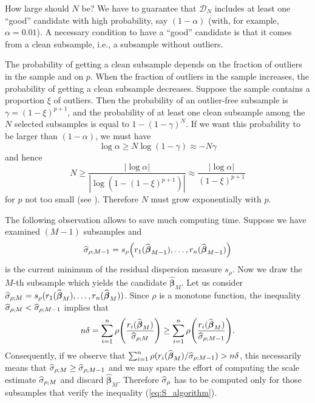 How large should $N$ be? We have to guarantee that $\mathcal{D}_{N}$ includes
at least one “good” candidate with high probability, say $(1 - \alpha)$ (with,
for example, $\alpha = 0.01$). A necessary condition to have a “good” candidate
is that it comes from a clean subsample, i.e., a subsample without outliers.

The probability of getting a clean subsample depends on the fraction of
outliers in the sample and on $p$. When the fraction of outliers in the sample
increases, the probability of getting a clean subsample decreases. Suppose the
sample contains a proportion $\xi$ of outliers. Then the probability of an
outlier-free subsample is $\gamma = (1-\xi)^{p+1}$, and the probability of at
least one clean subsample among the $N$ selected subsamples is equal to
$1-(1-\gamma)^N$. If we want this probability to be larger than $(1-\alpha)$,
we must have
\[
    \log\alpha \geq N\log(1-\gamma) \approx -N\gamma
\]
and hence
%
\begin{equation}\label{eq:N}
    N \geq \frac{|\log\alpha|}{|\log(1 - (1-\xi)^{p+1})|}
    \approx \frac{|\log\alpha|}{(1-\xi)^{p+1}}
\end{equation}
%
for $p$ not too small (see \citealp{Salibian-Barrera:2004}). Therefore $N$
must grow exponentially with $p$.

The following observation allows to save much computing time. Suppose we have
examined $(M-1)$ subsamples and
\[
    \sthat{\sigma}_{\rho;M-1} = 
    s_{\rho} \left(r_{1}(\widehat{\boldsymbol\beta}_{M-1}), \dots,
    r_{n}(\widehat{\boldsymbol\beta}_{M-1})\right)
\]
is the current minimum of the residual dispersion measure $s_{\rho}$. Now we
draw the $M$-th subsample which yields the candidate
$\widehat{\boldsymbol\beta}_{M}$. Let us consider $\widehat{\sigma}_{\rho;M} =
s_{\rho}(r_{1}(\widehat{\boldsymbol\beta}_{M}),\allowbreak \dots,\allowbreak
r_{n}(\widehat{\boldsymbol\beta}_{M}))$. Since $\rho$ is a monotone function, the
inequality $\widehat{\sigma}_{\rho;M} < \widehat{\sigma}_{\rho;M-1}$ implies that
%
\begin{equation}\label{eq:S_algorithm}
    n\delta = \sum_{i=1}^{n} 
    \rho\left(\frac{r_{i}(\widehat{\boldsymbol\beta}_{M})}{\sthat{\sigma}_{\rho;M}}\right)
    \geq \sum_{i=1}^{n}
    \rho\left(\frac{r_{i}(\sthat{\boldsymbol\beta}_{M})}{\sthat{\sigma}_{\rho;M-1}}\right).
\end{equation}
%
Consequently, if we observe that $\sum_{i=1}^{n}
\rho(r_{i}(\widehat{\boldsymbol\beta}_{M})/\widehat{\sigma}_{\rho;M-1}) > n\delta$,
this necessarily means that $\widehat{\sigma}_{\rho;M} \geq
\widehat{\sigma}_{\rho;M-1}$ and we may spare the effort of computing the scale
estimate $\widehat{\sigma}_{\rho;M}$ and discard
$\widehat{\boldsymbol\beta}_{M}$. Therefore $\widehat{\sigma}_{\rho}$ has to be
computed only for those subsamples that verify the inequality
(\ref{eq:S_algorithm}).

